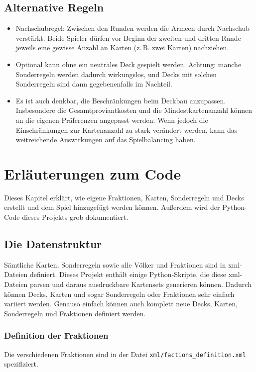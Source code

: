 \documentclass[a4paper,11pt]{report}
\begin{document}
\section{Alternative Regeln}
\begin{itemize}
	\item Nachschubregel: Zwischen den Runden werden die Armeen durch Nachschub verstärkt. Beide Spieler dürfen vor Beginn der zweiten und dritten Runde jeweils eine gewisse Anzahl an Karten (z.\,B. zwei Karten) nachziehen.
	\item Optional kann ohne ein neutrales Deck gespielt werden. Achtung: manche Sonderregeln werden dadurch wirkungslos, und Decks mit solchen Sonderregeln sind dann gegebenenfalls im Nachteil.
	\item Es ist auch denkbar, die Beschränkungen beim Deckbau anzupassen. Insbesondere die Gesamtproviantkosten und die Mindestkartenanzahl können an die eigenen Präferenzen angepasst werden. Wenn jedoch die Einschränkungen zur Kartenanzahl zu stark verändert werden, kann das weitreichende Auswirkungen auf das Spielbalancing haben.
\end{itemize}


\chapter{Erläuterungen zum Code}\label{ch:code}
Dieses Kapitel erklärt, wie eigene Fraktionen, Karten, Sonderregeln und Decks erstellt und dem Spiel hinzugefügt werden können. Außerdem wird der Python-Code dieses Projekts grob dokumentiert.

\section{Die Datenstruktur}
Sämtliche Karten, Sonderregeln sowie alle Völker und Fraktionen sind in xml-Dateien definiert. Dieses Projekt enthält einige Python-Skripte, die diese xml-Dateien parsen und daraus ausdruckbare Kartensets generieren können. Dadurch können Decks, Karten und sogar Sonderregeln oder Fraktionen sehr einfach variiert werden. Genauso einfach können auch komplett neue Decks, Karten, Sonderregeln und Fraktionen definiert werden.

\subsection{Definition der Fraktionen}
Die verschiedenen Fraktionen sind in der Datei \verb+xml/factions_definition.xml+ spezifiziert.
\end{document}
